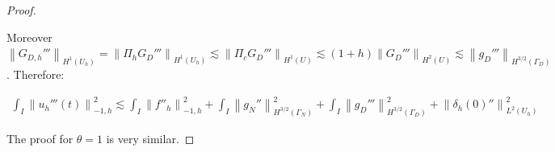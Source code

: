 \documentclass[english,a4paper,9pt,oneside]{scrbook}	%
\theoremstyle{break}
\newenvironment{mproof}[1][\proofname]{%
  \begin{proof}[#1]$ $\par\nobreak\ignorespaces
}{%
  \end{proof}
}
\renewcommand*{\proofname}{Proof}
\theoremstyle{remark}
\newcommand{\norm}[1]{\left\lVert#1\right\rVert}
\begin{document}
\begin{appendices}
\begin{mproof}
Moreover $\norm{G_{D,h}'''}_{H^1(U_h)} = \norm{\Pi_h G_D'''}_{H^1(U_h)}\lesssim  \norm{\Pi_c G_D'''}_{H^1(U)}\lesssim (1+h)\norm{G_D'''}_{H^2(U)}\lesssim \norm{g_D'''}_{H^{3/2}(\Gamma_D)}$.
Therefore:

\begin{align*}
	\int_I \norm{u_h'''(t)}_{-1,h}^2\lesssim \int_I \norm{f''_h}_{-1,h}^2+\int_I\norm{ g_{N}''}_{H^{3/2}(\Gamma_{N})}^2 + \int_I\norm{g_D'''}_{H^{3/2}(\Gamma_D)}^2 + \norm{\delta_{h}(0)''}_{L^2(U_h)}^2
\end{align*}


The proof for $\theta=1$ is very similar.

%
%
%
%
%
%
%

%
%
%
%


\end{mproof}
\end{appendices}
\end{document}
